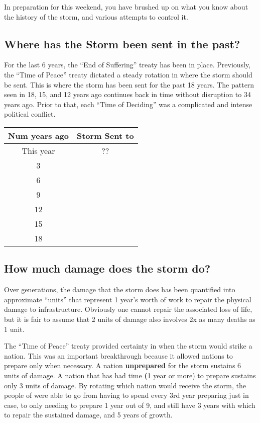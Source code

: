 \documentclass[blue]{GL2020}
\begin{document}
\name{\bStormHistory{}}

In preparation for this weekend, you have brushed up on what you know about the history of the storm, and various attempts to control it.

\subsection*{Where has the Storm been sent in the past?}
For the last 6 years, the ``End of Suffering'' treaty has been in place. Previously, the ``Time of Peace'' treaty dictated a steady rotation in where the storm should be sent. This is where the storm has been sent for the past 18 years. The pattern seen in 18, 15, and 12 years ago continues back in time without disruption to 34 years ago. Prior to that, each ``Time of Deciding'' was a complicated and intense political conflict.

\begin{tabular}{ | c | c | }
\hline
 \textbf{ Num years ago} & \textbf{Storm Sent to} \\ 
\hline
 This year & ?? \\
\hline  
 3 & \pShip{} \\
\hline
 6 & \pShip{} \\
\hline
 9 & \pFarm{} \\
\hline
 12 & \pShip{} \\
\hline
 15 & \pTech{} \\
\hline
 18 & \pFarm{} \\
\hline
\end{tabular}

\subsection*{How much damage does the storm do?}
Over generations, the damage that the storm does has been quantified into approximate ``units'' that represent 1 year's worth of work to repair the physical damage to infrastructure. Obviously one cannot repair the associated loss of life, but it is fair to assume that 2 units of damage also involves 2x as many deaths as 1 unit.

The ``Time of Peace'' treaty provided certainty in when the storm would strike a nation. This was an important breakthrough because it allowed nations to prepare only when necessary. A nation \textbf{unprepared} for the storm sustains 6 units of damage. A nation that has had time \textbf(1 year or more) to prepare sustains only 3 units of damage. By rotating which nation would receive the storm, the people of \pEarth{} were able to go from having to spend every 3rd year preparing just in case, to only needing to prepare 1 year out of 9, and still have 3 years with which to repair the sustained damage, and 5 years of growth.
\end{document}
